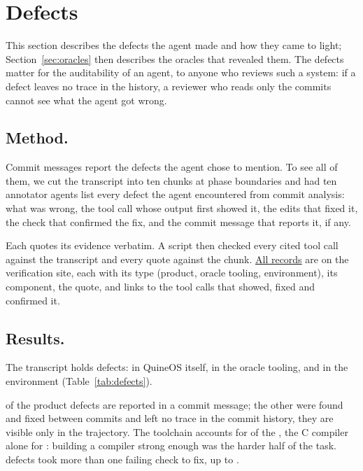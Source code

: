 \documentclass{article}
\newcommand{\sysname}{QuineOS}
\begin{document}
\section{Defects}\label{sec:defectlist}

This section describes the defects the agent made and how they came to light;
Section~\ref{sec:oracles} then describes the oracles that revealed them. The defects matter
for the auditability of an agent, to anyone who reviews such a system: if a defect leaves
no trace in the history, a reviewer who reads only the commits cannot see what the agent
got wrong.

\subsection{Method.} Commit messages report the defects the agent chose to mention. To
see all of them, we cut the transcript into ten chunks at phase boundaries and had ten
annotator agents list every defect the agent encountered from commit analysis: what was wrong, the tool call
whose output first showed it, the edits that fixed it, the check that confirmed the fix,
and the commit message that reports it, if any.

Each quotes its evidence
verbatim. A script then checked every cited tool call against the transcript and every
quote against the chunk. 
\href{\siteurl/defects.html}{All records} are on
the verification site, each with its type (product, oracle tooling, environment), its
component, the quote, and links to the tool calls that showed, fixed and
confirmed it.

\subsection{Results.} The transcript holds \ntdefects{} defects: \ntproduct{} in
\sysname{} itself, \ntoracle{} in the oracle tooling, and \ntenv{} in the environment
(Table~\ref{tab:defects}).

\ntreported{} of the \ntproduct{} product defects are
reported in a commit message; the other \ntunreported{} were found and fixed between
commits and left no trace in the commit history, they are visible only in the trajectory. The toolchain accounts for \nttoolchain{} of
the \ntproduct{}, the C compiler alone for \ntcc{}: building a compiler strong enough
was the harder half of the task. \ntmultiattempt{} defects took more than one failing
check to fix, up to \ntmaxattempts{}. 


\end{document}
